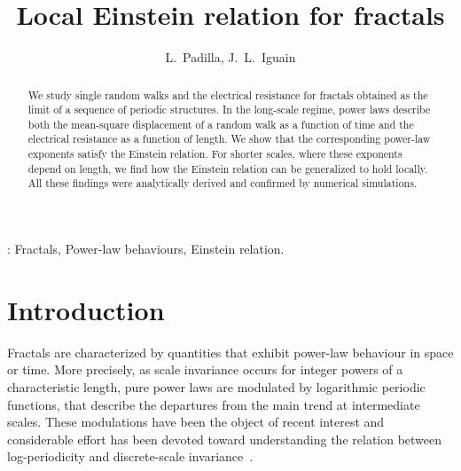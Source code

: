 \documentclass[12pt]{iopart}
\begin{document}
\newcommand{\wq}[1]{\textcolor{blue}{#1}}


\title{Local Einstein relation for fractals}

\author{L.~Padilla,  J.~L.~Iguain}

\address{Instituto de Investigaciones F\'{\i}sicas de Mar del Plata (IFIMAR) 
and\\
Departamento de F\'{\i}sica FCEyN,
Universidad Nacional de Mar del Plata,\\
De\'an Funes 3350, 7600 Mar del Plata, Argentina}



\begin{abstract}
We study single random walks and the  electrical resistance
for fractals obtained as the limit of a sequence of periodic structures. 
In the long-scale regime,  power laws describe
  both the mean-square  displacement of a random walk as a function of time and the electrical resistance as a function of length. We show that
  the corresponding power-law exponents satisfy the Einstein relation.
For shorter scales, where these exponents depend on length, we find how
the Einstein relation can be generalized to hold locally. All these
  findings were analytically derived and confirmed by numerical
  simulations.
\end{abstract}
: Fractals, Power-law behaviours, Einstein
relation.

\maketitle


\section{Introduction}\label{sec:intro}

Fractals are characterized by quantities that exhibit power-law behaviour 
in space or time.
More precisely, as scale invariance occurs for
integer powers of a characteristic length, pure power laws are 
modulated by logarithmic periodic functions, that
describe the departures from the main trend at intermediate scales. 
These modulations have been the object of recent interest
and considerable effort has been devoted toward understanding
the relation between log-periodicity and discrete-scale invariance~\cite{Grabner1997, acedo2000, bab2008EPL, bab2008JCP, 
maltz2008, weber2010, Padilla2009, Padilla2010, Padilla2011, havlin2000, bernhard2004, 
Padilla2012,refId0}.
\end{document}
